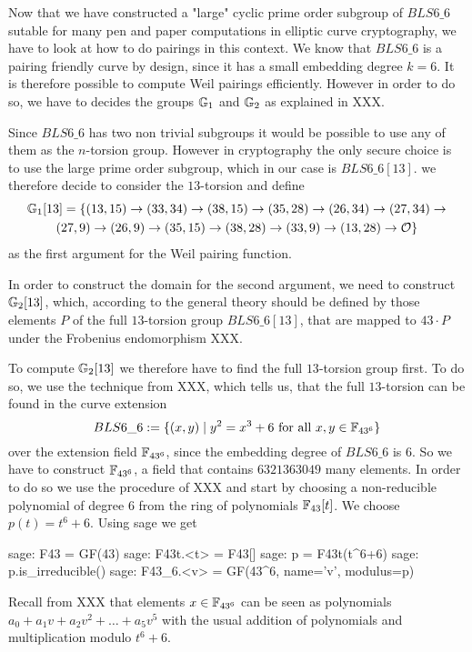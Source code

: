 \endgroup

Now that we have constructed a "large" cyclic prime order subgroup of $BLS6\_6$ sutable for many pen and paper computations in elliptic curve cryptography, we have to look at how to do pairings in this context. We know that $BLS6\_6$ is a pairing friendly curve by design, since it has a small embedding degree $k=6$. It is therefore possible to compute Weil pairings efficiently. However in order to do so, we have to decides the groups $\mathbb{G}_1$ and $\mathbb{G}_2$ as explained in XXX. 

Since $BLS6\_6$ has two non trivial subgroups it would be possible to use any of them as the $n$-torsion group. However in cryptography the only secure choice is to use the large prime order subgroup, which in our case is $BLS6\_6[13]$. we therefore decide to consider the $13$-torsion and define 
\begin{multline*}
\mathbb{G}_1[13]=\{(13,15) \rightarrow (33,34) \rightarrow  (38,15) \rightarrow  (35,28) \rightarrow (26,34) \rightarrow  (27,34) \rightarrow  \\ 
(27,9)  \rightarrow  (26,9) \rightarrow  (35,15) \rightarrow  (38,28) \rightarrow  (33,9) \rightarrow (13,28) \rightarrow  \mathcal{O}\}$$
\end{multline*}
as the first argument for the Weil pairing function.

In order to construct the domain for the second argument, we need to construct $\mathbb{G}_2[13]$, which, according to the general theory should be defined by those elements $P$ of the full $13$-torsion group $BLS6\_6[13]$, that are mapped to $43\cdot P$ under the Frobenius endomorphism XXX. 

To compute $\mathbb{G}_2[13]$ we therefore have to find the full $13$-torsion group first. To do so, we use the technique from XXX, which tells us, that the full $13$-torsion can be found in the curve extension 
\begin{equation}
BLS6\_6 := \{(x,y)\;|\; y^2 = x^3 + 6 \text{ for all } x,y \in \mathbb{F}_{43^6}\}
\end{equation}
over the extension field $\mathbb{F}_{43^6}$, since the embedding degree of $BLS6\_6$ is $6$. So we have to construct $\mathbb{F}_{43^6}$, a field that contains $6321363049$ many elements. In order to do so we use the procedure of XXX and start by choosing a non-reducible polynomial of degree $6$ from the ring of polynomials $\mathbb{F}_{43}[t]$. We choose $p(t) = t^6+6$. Using sage we get
\begin{sagecommandline}
sage: F43 = GF(43)
sage: F43t.<t> = F43[]
sage: p = F43t(t^6+6)
sage: p.is_irreducible()
sage: F43_6.<v> = GF(43^6, name='v', modulus=p)
\end{sagecommandline}
Recall from XXX that elements $x\in\mathbb{F}_{43^6}$ can be seen as polynomials $a_0+a_1v + a_2v^2+\ldots + a_5 v^5$ with the usual addition of polynomials and multiplication modulo $t^6+6$. 

